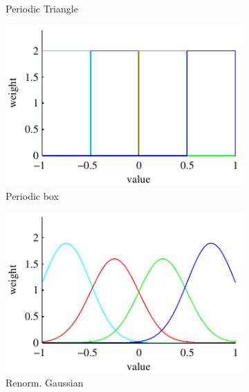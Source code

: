 \documentclass[thesis.tex]{subfiles}
\begin{document}
\begin{figure}
\begin{subfigure}[t]{0.32\textwidth}
		\caption{Periodic Triangle}
		\label{fig:1dFilterTrianglePeriodic}
	\end{subfigure}
	\begin{subfigure}[t]{0.32\textwidth}
		\includegraphics[width=\textwidth]{img/binFilterBoxPeriodic.pdf}
		\caption{Periodic box}
		\label{fig:1dFilterBoxPeriodic}
	\end{subfigure}
	\begin{subfigure}[t]{0.32\textwidth}
		\includegraphics[width=\textwidth]{img/binFilterGaussianRenorm.pdf}
		\caption{Renorm. Gaussian}
		\label{fig:1dFilterGaussianRenorm}
	\end{subfigure}
	\begin{subfigure}[t]{0.32\textwidth}

\end{subfigure}
\end{figure}
\end{document}
